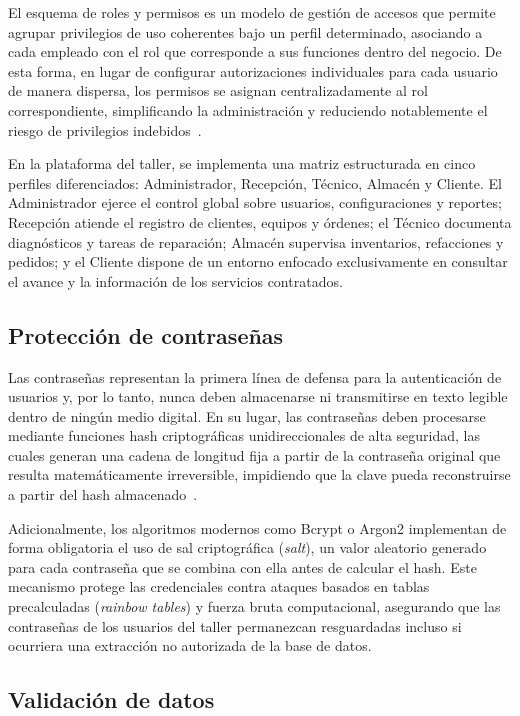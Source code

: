 El esquema de roles y permisos es un modelo de gestión de accesos que permite agrupar privilegios de uso coherentes bajo un perfil determinado, asociando a cada empleado con el rol que corresponde a sus funciones dentro del negocio. De esta forma, en lugar de configurar autorizaciones individuales para cada usuario de manera dispersa, los permisos se asignan centralizadamente al rol correspondiente, simplificando la administración y reduciendo notablemente el riesgo de privilegios indebidos~\cite{owasp_authorization}.

En la plataforma del taller, se implementa una matriz estructurada en cinco perfiles diferenciados: Administrador, Recepción, Técnico, Almacén y Cliente. El Administrador ejerce el control global sobre usuarios, configuraciones y reportes; Recepción atiende el registro de clientes, equipos y órdenes; el Técnico documenta diagnósticos y tareas de reparación; Almacén supervisa inventarios, refacciones y pedidos; y el Cliente dispone de un entorno enfocado exclusivamente en consultar el avance y la información de los servicios contratados.

\subsection{Protección de contraseñas}

Las contraseñas representan la primera línea de defensa para la autenticación de usuarios y, por lo tanto, nunca deben almacenarse ni transmitirse en texto legible dentro de ningún medio digital. En su lugar, las contraseñas deben procesarse mediante funciones hash criptográficas unidireccionales de alta seguridad, las cuales generan una cadena de longitud fija a partir de la contraseña original que resulta matemáticamente irreversible, impidiendo que la clave pueda reconstruirse a partir del hash almacenado~\cite{owasp_password_storage}.

Adicionalmente, los algoritmos modernos como Bcrypt o Argon2 implementan de forma obligatoria el uso de sal criptográfica (\textit{salt}), un valor aleatorio generado para cada contraseña que se combina con ella antes de calcular el hash. Este mecanismo protege las credenciales contra ataques basados en tablas precalculadas (\textit{rainbow tables}) y fuerza bruta computacional, asegurando que las contraseñas de los usuarios del taller permanezcan resguardadas incluso si ocurriera una extracción no autorizada de la base de datos.

\subsection{Validación de datos}


